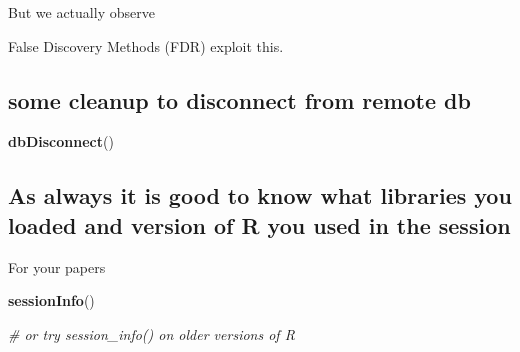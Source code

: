 \documentclass[
]{article}
\newenvironment{Shaded}{\begin{snugshade}}{\end{snugshade}}
\newcommand{\CommentTok}[1]{\textcolor[rgb]{0.56,0.35,0.01}{\textit{#1}}}
\newcommand{\KeywordTok}[1]{\textcolor[rgb]{0.13,0.29,0.53}{\textbf{#1}}}
\newcommand{\NormalTok}[1]{#1}
\newcommand{\OperatorTok}[1]{\textcolor[rgb]{0.81,0.36,0.00}{\textbf{#1}}}
\begin{document}
But we actually observe

\begin{Shaded}
\end{Shaded}

False Discovery Methods (FDR) exploit this.

\hypertarget{some-cleanup-to-disconnect-from-remote-db}{%
\subsection{some cleanup to disconnect from remote
db}\label{some-cleanup-to-disconnect-from-remote-db}}

\begin{Shaded}
\begin{Highlighting}[]
\KeywordTok{dbDisconnect}\NormalTok{() }
\end{Highlighting}
\end{Shaded}

\hypertarget{as-always-it-is-good-to-know-what-libraries-you-loaded-and-version-of-r-you-used-in-the-session}{%
\subsection{As always it is good to know what libraries you loaded and
version of R you used in the
session}\label{as-always-it-is-good-to-know-what-libraries-you-loaded-and-version-of-r-you-used-in-the-session}}

For your papers

\begin{Shaded}
\begin{Highlighting}[]
\KeywordTok{sessionInfo}\NormalTok{()}

\CommentTok{# or try session_info() on older versions of R}
\end{Highlighting}
\end{Shaded}
\end{document}
